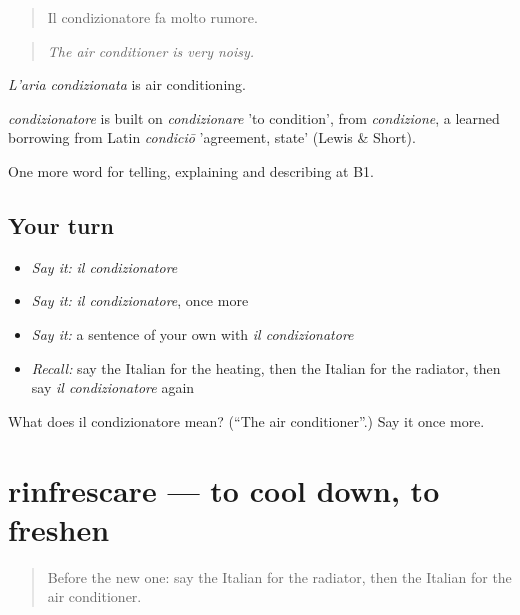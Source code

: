 \begin{quote}
Il condizionatore fa molto rumore.
\end{quote}

\begin{quote}
\emph{The air conditioner is very noisy.}
\end{quote}

\emph{L'aria condizionata} is air conditioning.

\begin{cousinweb}
\emph{condizionatore} is built on \emph{condizionare} 'to condition', from \emph{condizione}, a learned borrowing from Latin \emph{condiciō} 'agreement, state' (Lewis \& Short).
\end{cousinweb}

\begin{grammarlens}[title={What you've built}]
One more word for telling, explaining and describing at B1.
\end{grammarlens}

\subsection*{Your turn}
\begin{itemize}
\raggedright
  \item \emph{Say it:} \emph{il condizionatore}
  \item \emph{Say it:} \emph{il condizionatore}, once more
  \item \emph{Say it:} a sentence of your own with \emph{il condizionatore}
  \item \emph{Recall:} say the Italian for the heating, then the Italian for the radiator, then say \emph{il condizionatore} again
\end{itemize}

\begin{tcolorbox}[breakable,colback=teal!4,colframe=teal!35!black,title={Before you move on}]
What does il condizionatore mean? (\textquotedblleft{}The air conditioner\textquotedblright{}.) Say it once more.
\end{tcolorbox}
\section[rinfrescare]{rinfrescare — to cool down, to freshen}

\label{lesson:IT-C435-rinfrescare}



\begin{quote}
Before the new one: say the Italian for the radiator, then the Italian for the air conditioner.
\end{quote}

